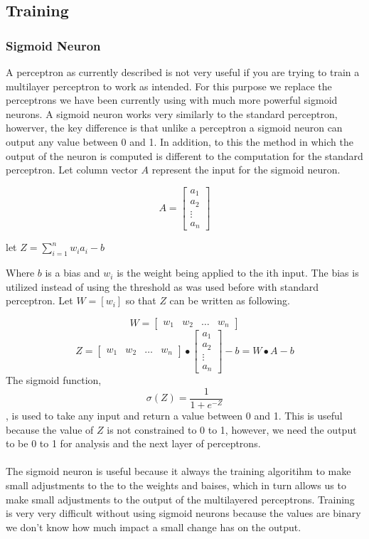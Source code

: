 \subsection{Training}

\subsubsection{Sigmoid Neuron}

A perceptron as currently described is not very useful if you are trying to train a multilayer perceptron to work as intended. For this purpose we replace the perceptrons we have been currently using with much more powerful sigmoid neurons. A sigmoid neuron works very similarly to the standard perceptron, howerver, the key difference is that unlike a perceptron a sigmoid neuron can output any value between 0 and 1. In addition, to this the method in which the output of the neuron is computed is different to the computation for the standard perceptron. Let column vector $A$ represent the input for the sigmoid neuron.

$$
	A = 
	\begin{bmatrix}
		a_1 \\
		a_2 \\
		\vdots \\
		a_n
	\end{bmatrix}
$$
\begin{center}
	let $Z = \sum_{i=1}^{n} w_ia_i - b$
\end{center}
Where $b$ is a bias and $w_i$ is the weight being applied to the ith input. The bias is utilized instead of using the threshold as was used before with standard perceptron. Let $W=[w_i]$ so that $Z$ can be written as following.

$$	W=
	 \begin{bmatrix}
		w_1 & w_2 & \dots & w_n
	\end{bmatrix}
$$
$$	
	Z = \begin{bmatrix}
		w_1 & w_2 & \dots & w_n
	\end{bmatrix}	
	\bullet
	\begin{bmatrix}
		a_1 \\ a_2 \\ \vdots \\ a_n	
	\end{bmatrix} - b
	 = W \bullet A - b
$$
The sigmoid function, $$\sigma(Z) = \frac{1}{1+e^{-Z}}$$, is used to take any input and return a value between 0 and 1. This is useful because the value of $Z$ is not constrained to 0 to 1, however, we need the output to be 0 to 1 for analysis and the next layer of perceptrons. \\ \\
The sigmoid neuron is useful because it always the training algoritihm to make small adjustments to the to the weights and baises, which in turn allows us to make small adjustments to the output of the multilayered perceptrons. Training is very very difficult without using sigmoid neurons because the values are binary we don't know how much impact a small change has on the output. 


